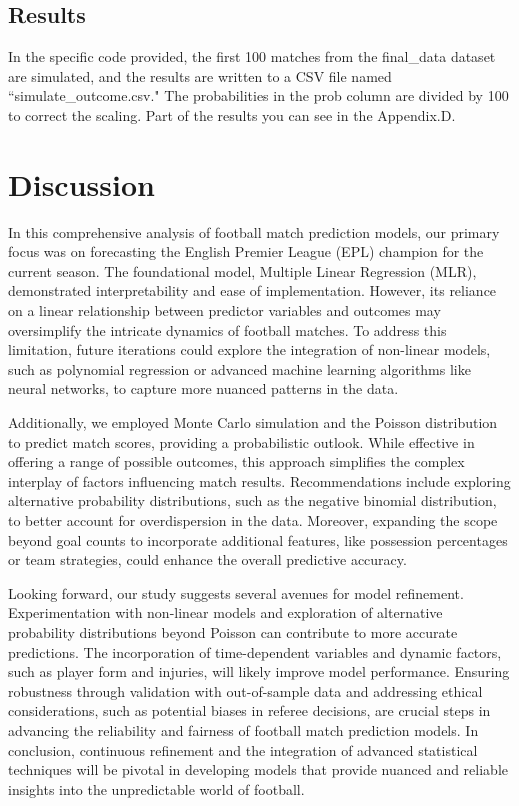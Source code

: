 \documentclass[12pt]{article}
\begin{document}
\subsection{Results}
In the specific code provided, the first 100 matches from the final\_data dataset are simulated, and the results are written to a CSV file named ``simulate\_outcome.csv." The probabilities in the prob column are divided by 100 to correct the scaling. Part of the results you can see in the Appendix.D.
\section{Discussion}
\label{sec:con}
In this comprehensive analysis of football match prediction models, our primary focus was on forecasting the English Premier League (EPL) champion for the current season. The foundational model, Multiple Linear Regression (MLR), demonstrated interpretability and ease of implementation. However, its reliance on a linear relationship between predictor variables and outcomes may oversimplify the intricate dynamics of football matches. To address this limitation, future iterations could explore the integration of non-linear models, such as polynomial regression or advanced machine learning algorithms like neural networks, to capture more nuanced patterns in the data.

Additionally, we employed Monte Carlo simulation and the Poisson distribution to predict match scores, providing a probabilistic outlook. While effective in offering a range of possible outcomes, this approach simplifies the complex interplay of factors influencing match results. Recommendations include exploring alternative probability distributions, such as the negative binomial distribution, to better account for overdispersion in the data. Moreover, expanding the scope beyond goal counts to incorporate additional features, like possession percentages or team strategies, could enhance the overall predictive accuracy.

Looking forward, our study suggests several avenues for model refinement. Experimentation with non-linear models and exploration of alternative probability distributions beyond Poisson can contribute to more accurate predictions. The incorporation of time-dependent variables and dynamic factors, such as player form and injuries, will likely improve model performance. Ensuring robustness through validation with out-of-sample data and addressing ethical considerations, such as potential biases in referee decisions, are crucial steps in advancing the reliability and fairness of football match prediction models. In conclusion, continuous refinement and the integration of advanced statistical techniques will be pivotal in developing models that provide nuanced and reliable insights into the unpredictable world of football.
\end{document}
